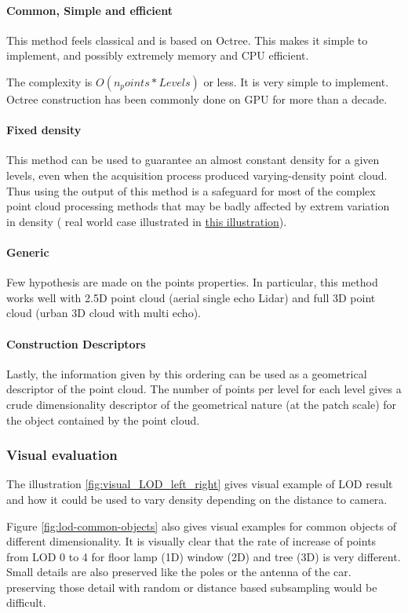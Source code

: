 	 		\paragraph{Common, Simple and efficient}
	 		This method feels classical and is based on Octree. This makes it simple to implement, and possibly extremely memory and CPU efficient.
	 		
	 		The complexity is $O(n_points*Levels)$ or less. It is very simple to implement.				
	 		Octree construction has been commonly done on GPU for more than a decade.
	 		
	 		\paragraph{Fixed density}
	 		This method can be used to guarantee an almost constant density for a given levels, even when the acquisition process produced varying-density point cloud.
	 		Thus using the output of this method is a safeguard for most of the complex point cloud processing methods that may be badly affected by extrem variation in density ( real world case illustrated in \href{fig:density-variation}{this illustration}).
	 		\paragraph{Generic}
	 		Few hypothesis are made on the points properties. In particular, this method works well with 2.5D point cloud (aerial single echo Lidar) and full 3D point cloud (urban 3D cloud with multi echo).
	 		\paragraph{Construction Descriptors}
	 		Lastly, the information given by this ordering can be used as a  geometrical descriptor of the point cloud.
	 		The number of points per level for each level gives a crude dimensionality descriptor of the geometrical nature (at the patch scale) for the object contained by the point cloud.
		 \subsubsection{Visual evaluation}
			 The illustration \ref{fig:visual_LOD_left_right} gives visual example of LOD result and how it could be used to vary density depending on the distance to camera.
			 
			 Figure \ref{fig:lod-common-objects} also gives visual examples for common objects of different dimensionality.
			 It is visually clear that the rate of increase of points from LOD 0 to 4 for floor lamp (1D) window (2D) and tree (3D) is very different.
			 Small details are also preserved like the poles or the antenna of the car. preserving those detail with random or distance based subsampling would be difficult.
			 
